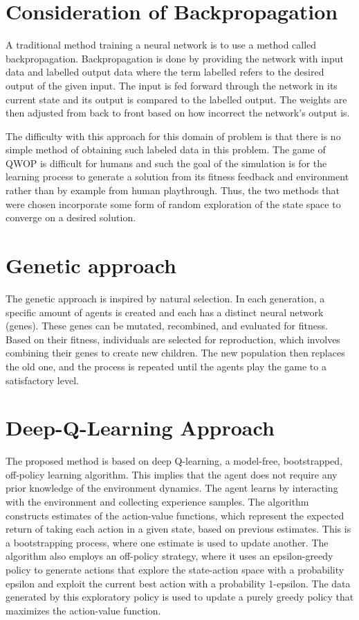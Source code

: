 \documentclass[letterpaper]{article} %
\begin{document}
\section{Consideration of Backpropagation}
A traditional method training a neural network is to use a method called backpropagation. Backpropagation is done by providing the network with input data and labelled output data where the term labelled refers to the desired output of the given input. The input is fed forward through the network in its current state and its output is compared to the labelled output. The weights are then adjusted from back to front based on how incorrect the network's output is. 

\par The difficulty with this approach for this domain of problem is that there is no simple method of obtaining such labeled data in this problem. The game of QWOP is difficult for humans and such the goal of the simulation is for the learning process to generate a solution from its fitness feedback and environment rather than by example from human playthrough. Thus, the two methods that were chosen incorporate some form of random exploration of the state space to converge on a desired solution.

\section{Genetic approach}
The genetic approach is inspired by natural selection. In each generation, a specific amount of agents is created and each has a distinct neural network (genes). These genes can be mutated, recombined, and evaluated for fitness. Based on their fitness, individuals are selected for reproduction, which involves combining their genes to create new children. The new population then replaces the old one, and the process is repeated until the agents play the game to a satisfactory level.

\section{Deep-Q-Learning Approach}
The proposed method is based on deep Q-learning, a model-free, bootstrapped, off-policy learning algorithm. This implies that the agent does not require any prior knowledge of the environment dynamics. The agent learns by interacting with the environment and collecting experience samples. The algorithm constructs estimates of the action-value functions, which represent the expected return of taking each action in a given state, based on previous estimates. This is a bootstrapping process, where one estimate is used to update another. The algorithm also employs an off-policy strategy, where it uses an epsilon-greedy policy to generate actions that explore the state-action space with a probability epsilon and exploit the current best action with a probability 1-epsilon. The data generated by this exploratory policy is used to update a purely greedy policy that maximizes the action-value function.
\end{document}
